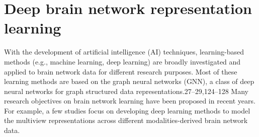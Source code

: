 \section{Deep brain network representation learning}
With the development of artificial intelligence (AI) techniques,
learning-based methods (e.g., machine learning, deep learning) are
broadly investigated and applied to brain network data for different
research purposes. Most of these learning methods are based on the graph
neural networks (GNN), a class of deep neural networks for graph structured 
data representations.27–29,124–128 Many research objectives
on brain network learning have been proposed in recent years. For
example, a few studies focus on developing deep learning methods to
model the multiview representations across different modalities-derived
brain network data.
\cite{Tang2023}